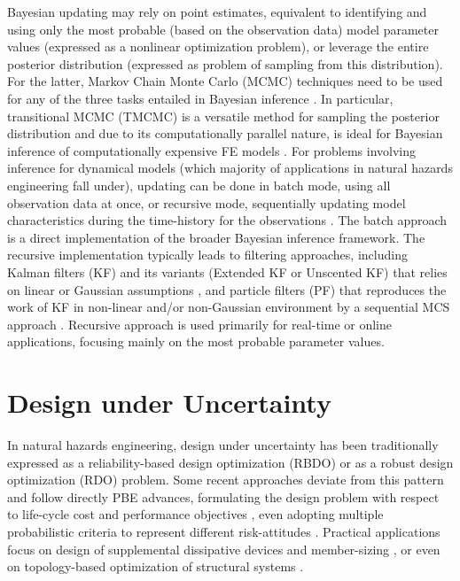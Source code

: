 Bayesian updating may rely on point estimates, equivalent to identifying and using only the most probable (based on the observation data) model parameter values (expressed as a nonlinear optimization problem), or leverage the entire posterior distribution (expressed as problem of sampling from this distribution). For the latter, Markov Chain Monte Carlo (MCMC) techniques need to be used for any of the three tasks entailed in Bayesian inference \citep{catanach2018bayesian}. In particular, transitional MCMC (TMCMC) is a versatile method for sampling the posterior distribution \citep{ching2007transitional,betz2016transitional} and due to its computationally parallel nature, is ideal for Bayesian inference of computationally expensive FE models \citep{ramancha2021bayesian, ramancha2021bayesianupdating}. For problems involving inference for dynamical models (which majority of applications in natural hazards engineering fall under), updating can be done in batch mode, using all observation data at once, or recursive mode, sequentially updating model characteristics during the time-history for the observations \citep{astroza2017batch,ramancha2021bayesianupdating}. The batch approach is a direct implementation of the broader Bayesian inference framework. The recursive implementation typically leads to filtering approaches, including Kalman filters (KF) and its variants (Extended KF or Unscented KF) that relies on linear or Gaussian assumptions \citep{astroza2017batch,kontoroupi2017online,erazo2018bayesian}, and particle filters (PF) that reproduces the work of KF in non-linear and/or non-Gaussian environment by a sequential MCS approach \citep{chatzi2009unscented, wei2013dynamic, olivier2017particle}. Recursive approach is used primarily for real-time or online applications, focusing mainly on the most probable parameter values. 

\section{Design under Uncertainty}
\label{sec:uq_design}

In natural hazards engineering, design under uncertainty has been traditionally expressed as a reliability-based design optimization (RBDO) \citep{spence2012large, chun2019systemreliabilitybased} or as a robust design optimization (RDO) \citep{greco2015robust} problem. Some recent approaches deviate from this pattern and follow directly PBE advances, formulating the design problem with respect to life-cycle cost and performance objectives \citep{shin2014minimum}, even adopting multiple probabilistic criteria to represent different risk-attitudes \citep{haukaas2012reliabilitybased, gidaris2017multiobjective, li2018probabilistic, deb2019simplified}. Practical applications focus on design of supplemental dissipative devices \citep{shin2014minimum, gidaris2017multiobjective, altieri2018reliabilitybased} and member-sizing \citep{huang2015performancebased, suksuwan2018optimization}, or even on topology-based optimization of structural systems \citep{bobby2017reliabilitybased, zhu2017topology}.

